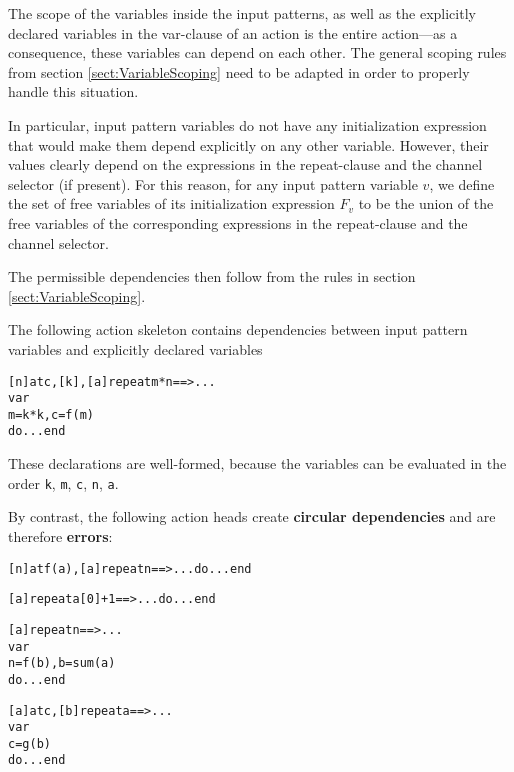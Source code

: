 

The
scope of the variables inside the input patterns, as well as the
explicitly declared variables in the var-clause of an action is the
entire action---as a consequence, these variables can depend on each
other. The general scoping rules from section
\ref{sect:VariableScoping} need to be adapted in order to properly
handle this situation.


In particular, input pattern variables do not have any initialization
expression that would make them depend explicitly on any other
variable.
However, their values clearly depend on the expressions in the
repeat-clause and the channel selector (if present). For this reason,
for any input pattern variable $v$, we define the set of free
variables of its initialization expression $F_v$ to be the union of
the free variables of the corresponding expressions in the
repeat-clause and the channel selector.

The permissible dependencies then follow from the rules in section
\ref{sect:VariableScoping}.

\begin{example}
  The following action skeleton contains dependencies between input
  pattern variables and explicitly declared variables
\begin{alltt}    [n] at c, [k], [a] repeat m * n ==> ...
    var
        m = k * k, c = f(m)
    do ... end
\end{alltt}
  These declarations are well-formed, because the variables can be
  evaluated in the order {\tt k}, {\tt m}, {\tt c}, {\tt n}, {\tt a}.

  By contrast, the following action heads create {\bf circular
    dependencies} and are therefore {\bf errors}:
\begin{alltt}    [n] at f(a), [a] repeat n ==> ... do ... end

    [a] repeat a[0] + 1 ==> ... do ... end

    [a] repeat n ==> ...
    var
        n = f(b), b = sum(a)
    do ... end

    [a] at c, [b] repeat a ==> ...
    var 
        c = g(b)
    do ... end
\end{alltt}
\end{example}

